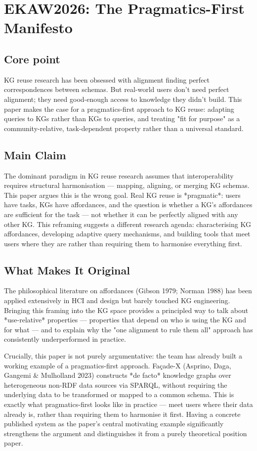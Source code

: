 \section*{EKAW2026:  The Pragmatics-First Manifesto}

\subsection*{Core point}

KG reuse research has been obsessed with alignment  finding perfect correspondences between schemas. But real-world users don't need perfect alignment; they need good-enough access to knowledge they didn't build. This paper makes the case for a pragmatics-first approach to KG reuse: adapting queries to KGs rather than KGs to queries, and treating "fit for purpose" as a community-relative, task-dependent property rather than a universal standard.

\subsection*{Main Claim}

The dominant paradigm in KG reuse research assumes that interoperability requires structural harmonisation — mapping, aligning, or merging KG schemas. This paper argues this is the wrong goal. Real KG reuse is *pragmatic*: users have tasks, KGs have affordances, and the question is whether a KG's affordances are sufficient for the task — not whether it can be perfectly aligned with any other KG. This reframing suggests a different research agenda: characterising KG affordances, developing adaptive query mechanisms, and building tools that meet users where they are rather than requiring them to harmonise everything first.

\subsection*{What Makes It Original}

The philosophical literature on affordances (Gibson 1979; Norman 1988) has been applied extensively in HCI and design but barely touched KG engineering. Bringing this framing into the KG space provides a principled way to talk about *use-relative* properties — properties that depend on who is using the KG and for what — and to explain why the "one alignment to rule them all" approach has consistently underperformed in practice.

Crucially, this paper is not purely argumentative: the team has already built a working example of a pragmatics-first approach. Façade-X (Asprino, Daga, Gangemi \& Mulholland 2023) constructs *de facto* knowledge graphs over heterogeneous non-RDF data sources via SPARQL, without requiring the underlying data to be transformed or mapped to a common schema. This is exactly what pragmatics-first looks like in practice — meet users where their data already is, rather than requiring them to harmonise it first. Having a concrete published system as the paper's central motivating example significantly strengthens the argument and distinguishes it from a purely theoretical position paper.

